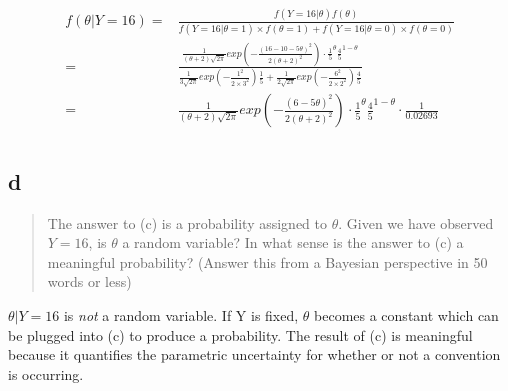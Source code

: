 \documentclass[11pt]{article}
\begin{document}
\begin{equation}
\begin{split}
f(\theta | Y = 16) = & \frac{f(Y = 16 | \theta) f(\theta)}{f(Y = 16 | \theta = 1) \times f(\theta = 1) + f(Y = 16 | \theta = 0) \times f(\theta = 0)}\\
= & \frac{\frac{1}{(\theta + 2) \sqrt{2 \pi}} exp(-\frac{(16 - 10 - 5 \theta)^2}{2 (\theta + 2)^2}) \cdot \frac{1}{5}^{\theta} \frac{4}{5}^{1 - \theta}}{\frac{1}{3 \sqrt{2 \pi}} exp(- \frac{1^2}{2 \times 3^2}) \frac{1}{5} + \frac{1}{2 \sqrt{2 \pi}} exp(- \frac{6^2}{2 \times 2^2}) \frac{4}{5}}\\
= & \frac{1}{(\theta + 2) \sqrt{2 \pi}} exp(-\frac{(6 - 5 \theta)^2}{2 (\theta + 2)^2}) \cdot \frac{1}{5}^{\theta} \frac{4}{5}^{1 - \theta} \cdot \frac{1}{0.02693}\\
\end{split}
\end{equation}


\subsection{d}
\label{sec:org7a161ec}

\begin{quote}
The answer to (c) is a probability assigned to \(\theta\). Given we have observed
\(Y = 16\), is \(\theta\) a random variable? In what sense is the answer to (c) a
meaningful probability? (Answer this from a Bayesian perspective in 50 words or less)
\end{quote}

\(\theta | Y = 16\) is \emph{not} a random variable. If Y is fixed, \(\theta\)
becomes a constant which can be plugged into (c) to produce a probability. The
result of (c) is meaningful because it quantifies the parametric uncertainty for
whether or not a convention is occurring.
\end{document}
